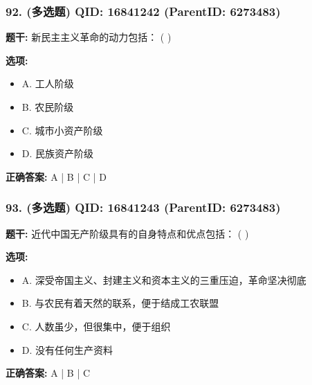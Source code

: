 \documentclass[12pt,UTF8]{ctexart}
\begin{document}
\subsubsection*{92. (多选题) \small QID: 16841242 (ParentID: 6273483)}

\textbf{题干:}
新民主主义革命的动力包括： ( )



\textbf{选项:}
\begin{itemize}[leftmargin=*]

  \item A. 工人阶级

  \item B. 农民阶级

  \item C. 城市小资产阶级

  \item D. 民族资产阶级

\end{itemize}

\textbf{正确答案:}
A | B | C | D

\vspace{0.3em}\hrulefill\vspace{0.7em}

\subsubsection*{93. (多选题) \small QID: 16841243 (ParentID: 6273483)}

\textbf{题干:}
近代中国无产阶级具有的自身特点和优点包括： ( )



\textbf{选项:}
\begin{itemize}[leftmargin=*]

  \item A. 深受帝国主义、封建主义和资本主义的三重压迫，革命坚决彻底

  \item B. 与农民有着天然的联系，便于结成工农联盟

  \item C. 人数虽少，但很集中，便于组织

  \item D. 没有任何生产资料

\end{itemize}

\textbf{正确答案:}
A | B | C

\vspace{0.3em}\hrulefill\vspace{0.7em}
\end{document}
